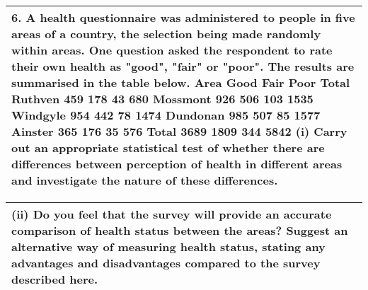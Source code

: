\documentclass[a4paper,12pt]{article}
\begin{document}
\begin{table}[ht!]
 \centering
 \begin{tabular}{|p{15cm}|}
 \hline  
6. A health questionnaire was administered to people in five areas of a country, the selection being made randomly within areas. One question asked the respondent to rate their own health as "good", "fair" or "poor". The results are summarised in the table below.
Area Good Fair Poor Total Ruthven  459  178  43  680 Mossmont  926  506 103 1535 Windgyle  954  442  78 1474 Dundonan  985  507  85 1577 Ainster  365  176  35  576 Total 3689 1809 344 5842
(i) Carry out an appropriate statistical test of whether there are differences between perception of health in different areas and investigate the nature of these differences.

\\ \hline
  \end{tabular}
\end{table}

\begin{table}[ht!]
 \centering
 \begin{tabular}{|p{15cm}|}
 \hline  
(ii) Do you feel that the survey will provide an accurate comparison of health status between the areas? Suggest an alternative way of measuring health status, stating any advantages and disadvantages compared to the survey described here.
\\ \hline
\end{tabular}
\end{table}
\end{document}
